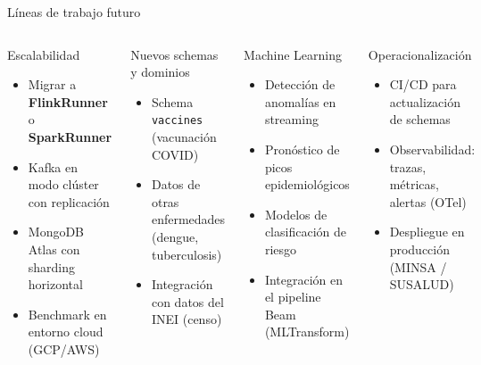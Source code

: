 \documentclass[aspectratio=169, 10pt]{beamer}
\begin{document}
\begin{frame}{L\'ineas de trabajo futuro}
  \begin{columns}[t]
      \begin{block}{Escalabilidad}
        \begin{itemize}\setlength\itemsep{2pt}
          \item Migrar a \textbf{FlinkRunner} o \textbf{SparkRunner}
          \item Kafka en modo clúster con replicaci\'on
          \item MongoDB Atlas con sharding horizontal
          \item Benchmark en entorno cloud (GCP/AWS)
        \end{itemize}
      \end{block}
      \vspace{6pt}
      \begin{block}{Nuevos schemas y dominios}
        \begin{itemize}\setlength\itemsep{2pt}
          \item Schema \texttt{vaccines} (vacunaci\'on COVID)
          \item Datos de otras enfermedades (dengue, tuberculosis)
          \item Integraci\'on con datos del INEI (censo)
        \end{itemize}
      \end{block}
      \begin{exampleblock}{Machine Learning}
        \begin{itemize}\setlength\itemsep{2pt}
          \item Detecci\'on de anomal\'ias en streaming
          \item Pron\'ostico de picos epidemiol\'ogicos
          \item Modelos de clasificaci\'on de riesgo
          \item Integraci\'on en el pipeline Beam (MLTransform)
        \end{itemize}
      \end{exampleblock}
      \vspace{6pt}
      \begin{exampleblock}{Operacionalizaci\'on}
        \begin{itemize}\setlength\itemsep{2pt}
          \item CI/CD para actualizaci\'on de schemas
          \item Observabilidad: trazas, m\'etricas, alertas (OTel)
          \item Despliegue en producci\'on (MINSA / SUSALUD)
        \end{itemize}
      \end{exampleblock}
  \end{columns}
\end{frame}
\end{document}
